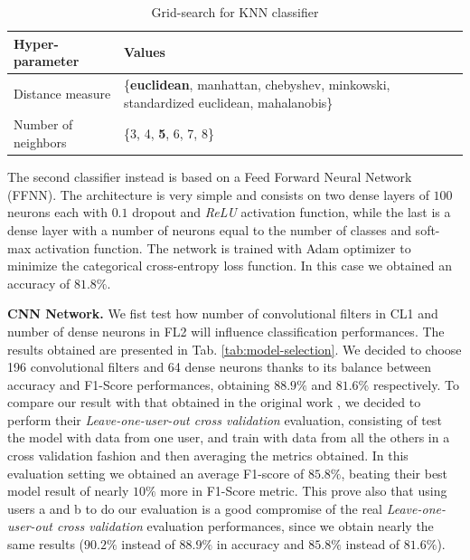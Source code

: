 \begin{table}[h]
	\centering
	\begin{tabular}{p{2.4cm}p{4.5cm}}
		\hline
		Hyper-parameter & Values \\
		\hline
		Distance measure & \{\textbf{euclidean}, manhattan, chebyshev, minkowski, standardized euclidean, mahalanobis\} \\
		Number of neighbors & \{3, 4, \textbf{5}, 6, 7, 8\} \\
		\hline
	\end{tabular}
	\caption{Grid-search for KNN classifier}
	\label{tab:knn-grid-search}
\end{table}

The second classifier instead is based on a Feed Forward Neural
Network (FFNN). The architecture is very simple and consists on two
dense layers of $100$ neurons each with $0.1$ dropout and
\textit{ReLU} activation function, while the last is a dense layer
with a number of neurons equal to the number of classes and soft-max
activation function. The network is trained with Adam optimizer to
minimize the categorical cross-entropy loss function. In this case we
obtained an accuracy of $81.8\%$.

\textbf{CNN Network.} We fist test how number of convolutional filters in CL1 and number of dense neurons in FL2 will influence classification performances. The results obtained are presented in Tab. \ref{tab:model-selection}. We decided to choose 196 convolutional filters and 64 dense neurons thanks to its balance between accuracy and F1-Score performances, obtaining $88.9\%$ and $81.6\%$ respectively. To compare our result with that obtained in the original work \cite{stisen2015smart}, we decided to perform their \textit{Leave-one-user-out cross validation} evaluation, consisting of test the model with data from one user, and train with data from all the others in a cross validation fashion and then averaging the metrics obtained. In this evaluation setting we obtained an average F1-score of $85.8\%$, beating their best model result of nearly $10\%$ more in F1-Score metric. This prove also that using users a and b to do our evaluation is a good compromise of the real \textit{Leave-one-user-out cross validation} evaluation performances, since we obtain nearly the same results ($90.2\%$ instead of $88.9\%$ in accuracy and $85.8\%$ instead of $81.6\%$).

